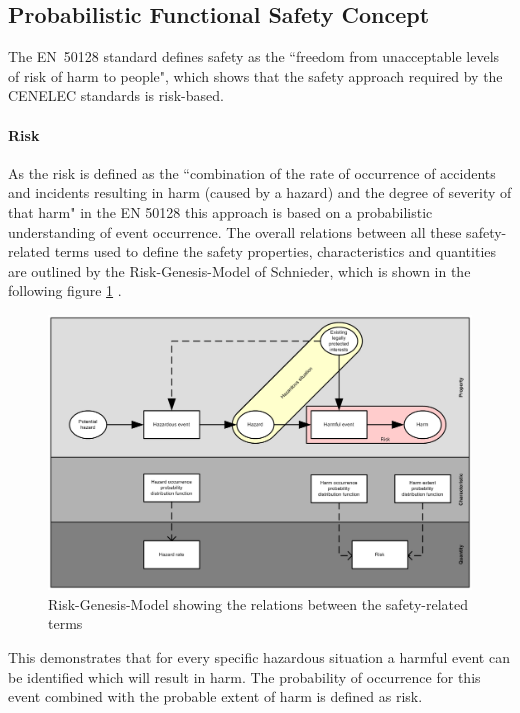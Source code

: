 \documentclass{template/openetcs_report}
\begin{document}
\subsection{Probabilistic Functional Safety Concept}

The EN~50128 standard defines safety as the ``freedom from unacceptable levels of risk of harm to people", which shows that the safety approach required by the CENELEC standards is risk-based.

\paragraph{Risk}

 As the risk is defined as the ``combination of the rate of occurrence of accidents and incidents resulting in harm (caused by a hazard) and the degree of severity  of that harm" in the EN 50128 this approach is based on a probabilistic understanding of event occurrence. The overall relations between all these safety-related terms used to define the safety properties, characteristics and quantities are outlined by the Risk-Genesis-Model of Schnieder, which is shown in the following figure \ref{fig:Risiko-Genese-Modell-eng} \cite{Schnieder.2010}.

\begin{figure}[htbp]
\centering
\includegraphics[width=0.8\linewidth]{bld_2013-06-19_Risiko-Genese-Modell-eng-2-0_jw}
\caption{Risk-Genesis-Model showing the relations between the safety-related terms \cite{Schnieder.2010}}
\label{fig:Risiko-Genese-Modell-eng}
\end{figure}

This demonstrates that for every specific hazardous situation a harmful event can be identified which will result in harm. The probability of occurrence for this event combined with the probable extent of harm is defined as risk.
\end{document}
